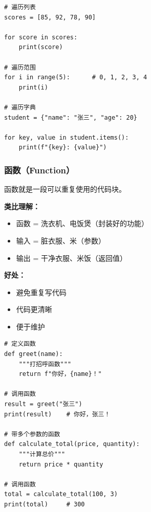 \documentclass[12pt,a4paper]{article}
\begin{document}
\begin{lstlisting}[caption={循环示例}]
# 遍历列表
scores = [85, 92, 78, 90]

for score in scores:
    print(score)

# 遍历范围
for i in range(5):      # 0, 1, 2, 3, 4
    print(i)

# 遍历字典
student = {"name": "张三", "age": 20}

for key, value in student.items():
    print(f"{key}: {value}")
\end{lstlisting}

\subsubsection{函数（Function）}

\begin{knowledgebox}
函数就是一段可以重复使用的代码块。

\textbf{类比理解：}
\begin{itemize}
    \item 函数 = 洗衣机、电饭煲（封装好的功能）
    \item 输入 = 脏衣服、米（参数）
    \item 输出 = 干净衣服、米饭（返回值）
\end{itemize}

\textbf{好处：}
\begin{itemize}
    \item 避免重复写代码
    \item 代码更清晰
    \item 便于维护
\end{itemize}
\end{knowledgebox}

\begin{lstlisting}[caption={函数示例}]
# 定义函数
def greet(name):
    """打招呼函数"""
    return f"你好，{name}！"

# 调用函数
result = greet("张三")
print(result)    # 你好，张三！

# 带多个参数的函数
def calculate_total(price, quantity):
    """计算总价"""
    return price * quantity

# 调用函数
total = calculate_total(100, 3)
print(total)     # 300
\end{lstlisting}
\end{document}
